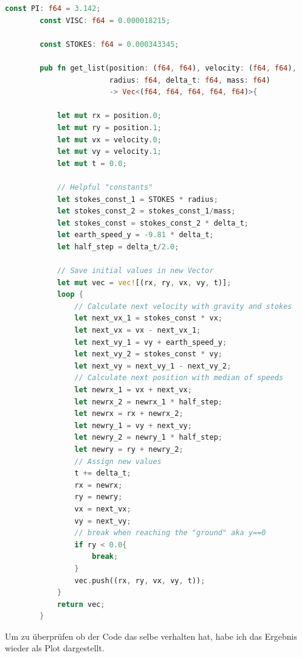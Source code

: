 \documentclass{artilcle}
\begin{document}
    \begin{lstlisting}[language=Rust, caption={Optimierter Code.}, label=lst:Codeblock besser]
        const PI: f64 = 3.142;
        const VISC: f64 = 0.000018215;

        const STOKES: f64 = 0.000343345;

        pub fn get_list(position: (f64, f64), velocity: (f64, f64),
                        radius: f64, delta_t: f64, mass: f64)
                        -> Vec<(f64, f64, f64, f64, f64)>{

            let mut rx = position.0;
            let mut ry = position.1;
            let mut vx = velocity.0;
            let mut vy = velocity.1;
            let mut t = 0.0;

            // Helpful "constants"
            let stokes_const_1 = STOKES * radius;
            let stokes_const_2 = stokes_const_1/mass;
            let stokes_const = stokes_const_2 * delta_t;
            let earth_speed_y = -9.81 * delta_t;
            let half_step = delta_t/2.0;

            // Save initial values in new Vector
            let mut vec = vec![(rx, ry, vx, vy, t)];
            loop {
                // Calculate next velocity with gravity and stokes
                let next_vx_1 = stokes_const * vx;
                let next_vx = vx - next_vx_1;
                let next_vy_1 = vy + earth_speed_y;
                let next_vy_2 = stokes_const * vy;
                let next_vy = next_vy_1 - next_vy_2;
                // Calculate next position with median of speeds
                let newrx_1 = vx + next_vx;
                let newrx_2 = newrx_1 * half_step;
                let newrx = rx + newrx_2;
                let newry_1 = vy + next_vy;
                let newry_2 = newry_1 * half_step;
                let newry = ry + newry_2;
                // Assign new values
                t += delta_t;
                rx = newrx;
                ry = newry;
                vx = next_vx;
                vy = next_vy;
                // break when reaching the "ground" aka y==0
                if ry < 0.0{
                    break;
                }
                vec.push((rx, ry, vx, vy, t));
            }
            return vec;
        }
    \end{lstlisting}

    \newpage

    Um zu überprüfen ob der Code das selbe verhalten hat, habe ich das Ergebnis wieder als Plot dargestellt.
\end{document}
